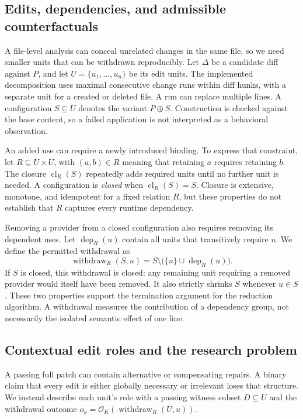 \documentclass[a4paper,fleqn]{cas-sc}
\newcommand{\cl}{\operatorname{cl}}
\newcommand{\withdraw}{\operatorname{withdraw}}
\begin{document}
\subsection{Edits, dependencies, and admissible counterfactuals}\label{sec:configuration}

A file-level analysis can conceal unrelated changes in the same file, so we need smaller units that can be withdrawn reproducibly. Let $\Delta$ be a candidate diff against $P$, and let $U=\{u_1,\ldots,u_n\}$ be its edit units. The implemented decomposition uses maximal consecutive change runs within diff hunks, with a separate unit for a created or deleted file. A run can replace multiple lines. A configuration $S\subseteq U$ denotes the variant $P\oplus S$. Construction is checked against the base content, so a failed application is not interpreted as a behavioral observation.

An added use can require a newly introduced binding. To express that constraint, let $R\subseteq U\times U$, with $(a,b)\in R$ meaning that retaining $a$ requires retaining $b$. The closure $\cl_R(S)$ repeatedly adds required units until no further unit is needed. A configuration is \emph{closed} when $\cl_R(S)=S$. Closure is extensive, monotone, and idempotent for a fixed relation $R$, but these properties do not establish that $R$ captures every runtime dependency.

Removing a provider from a closed configuration also requires removing its dependent uses. Let $\operatorname{dep}_R(u)$ contain all units that transitively require $u$. We define the permitted withdrawal as
\begin{equation}
\withdraw_R(S,u)=S\setminus\bigl(\{u\}\cup\operatorname{dep}_R(u)\bigr).
\label{eq:withdraw}
\end{equation}
If $S$ is closed, this withdrawal is closed: any remaining unit requiring a removed provider would itself have been removed. It also strictly shrinks $S$ whenever $u\in S$. These two properties support the termination argument for the reduction algorithm. A withdrawal measures the contribution of a dependency group, not necessarily the isolated semantic effect of one line.

\subsection{Contextual edit roles and the research problem}\label{sec:roles}

A passing full patch can contain alternative or compensating repairs. A binary claim that every edit is either globally necessary or irrelevant loses that structure. We instead describe each unit's role with a passing witness subset $D\subseteq U$ and the withdrawal outcome $o_u=\mathcal{O}_K(\withdraw_R(U,u))$.
\end{document}
